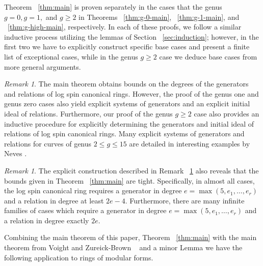 \documentclass{amsart}
\theoremstyle{plain}
\theoremstyle{definition}
\theoremstyle{remark}
\newtheorem{rem}[thm]{Remark}
\numberwithin{equation}{section}
\begin{document}
Theorem ~\ref{thm:main} is proven separately in the cases that the genus $g = 0, g = 1,$ and $g \geq 2$ in Theorems ~\ref{thm:g-0-main}, ~\ref{thm:g-1-main}, and ~\ref{thm:g-high-main}, respectively.  In each of these proofs, we follow a similar inductive process utilizing the lemmas of Section ~\ref{sec:induction}; however, in the first two we have to explicitly construct specific base cases and present a finite list of exceptional cases, while in the genus $g \geq 2$ case we deduce base cases from more general arguments.
\begin{rem}
\label{rem:explicit-generators}
The main theorem obtains bounds on the degrees of the generators
and relations of log spin canonical rings. However, the proof
of the genus one and genus zero cases also yield explicit systems
of generators and an explicit initial ideal of relations.
Furthermore, our proof of the genus $g \geq 2$ case also provides
an inductive procedure for explicitly determining the generators
and initial ideal of relations of log spin canonical rings. Many
explicit systems of generators and relations for curves of genus $2
\leq g \leq 15$ are detailed in interesting examples by Neves
\cite[Section III.4]{neves:halfcan}. 
\end{rem}
\begin{rem}
The explicit construction described in Remark ~\ref{rem:explicit-generators} also reveals that the bounds given in Theorem ~\ref{thm:main} are tight.
Specifically, in almost all cases, the log spin canonical ring requires a generator in degree $e = \max(5, e_1, \ldots, e_r)$ and a relation in degree at least $2e-4$. 
Furthermore, there are many infinite families of cases which require a generator in degree $e = \max(5, e_1, \ldots, e_r)$ and a relation in degree exactly $2e$.
\end{rem}

Combining the main theorem of this paper, Theorem ~\ref{thm:main} with the main theorem from Voight and Zureick-Brown ~\cite
[Theorem 1.4]{vzb:stacky} and a minor Lemma \cite[Lemma 10.2.1]{vzb:stacky}
we have the following application to
rings of modular forms. 
\end{document}
